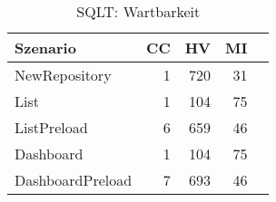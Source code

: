\begin{table}[ht]
\centering
\caption{SQLT: Wartbarkeit}
\begin{tabular}{lrrrr}
\toprule
Szenario & CC & HV & MI \\
\midrule
	NewRepository & 1 & 720 & 31 \\
	List & 1 & 104 & 75 \\
	ListPreload & 6 & 659 & 46 \\
	Dashboard & 1 & 104 & 75 \\
	DashboardPreload & 7 & 693 & 46 \\
\bottomrule
\end{tabular}
\label{tab:sqlt_maintainability}
\end{table}
	